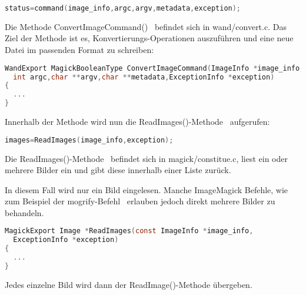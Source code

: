 \begin{lstlisting}[firstnumber=172, language=C, caption=wand/migrify.c Aufruf des ConvertImageCommand,label={lst:lstlisting}]
status=command(image_info,argc,argv,metadata,exception);
\end{lstlisting}
\vspace{5mm}


Die Methode ConvertImageCommand()~\cite{DeklarationConvertIMageCommand} befindet sich in wand/convert.c. Das Ziel der Methode ist es, Konvertierungs-Operationen auszuführen und eine neue Datei im passenden Format zu schreiben:\\

\begin{lstlisting}[firstnumber=498, language=C, caption=wand/convert.c ConvertImageCommand(),label={lst:lstlisting}]
WandExport MagickBooleanType ConvertImageCommand(ImageInfo *image_info,
  int argc,char **argv,char **metadata,ExceptionInfo *exception)
{
  ...
}
\end{lstlisting}
\vspace{5mm}

Innerhalb der Methode wird nun die ReadImages()-Methode~\cite{AufrufReadImages} aufgerufen:

\begin{lstlisting}[firstnumber=628, language=C, caption=wand/convert.c Aufruf ReadImages(),label={lst:lstlisting}]
  images=ReadImages(image_info,exception);
\end{lstlisting}
\vspace{5mm}

Die ReadImages()-Methode~\cite{DeklarationReadImages} befindet sich in magick/constitue.c,
liest ein oder mehrere Bilder ein und gibt diese innerhalb einer Liste zurück.

\newpage

In diesem Fall wird nur ein Bild eingelesen.
Manche ImageMagick Befehle, wie zum Beispiel der mogrify-Befehl~\cite{MogrifyCommand} erlauben jedoch direkt mehrere Bilder zu behandeln.\\

\begin{lstlisting}[firstnumber=790, language=C, caption=magick/constitute.c ReadImages(),label={lst:lstlisting}]
MagickExport Image *ReadImages(const ImageInfo *image_info,
  ExceptionInfo *exception)
{
  ...
}
\end{lstlisting}
\vspace{5mm}

Jedes einzelne Bild wird dann der ReadImage()-Methode übergeben.\\


